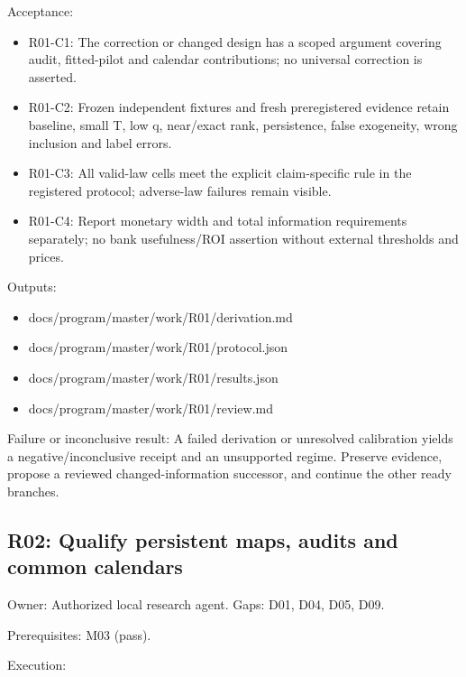 \documentclass[
  11pt,
  a4paper,
]{article}
\providecommand{\tightlist}{%
  \setlength{\itemsep}{0pt}\setlength{\parskip}{0pt}}
\begin{document}
Acceptance:

\begin{itemize}
\tightlist
\item
  R01-C1: The correction or changed design has a scoped argument
  covering audit, fitted-pilot and calendar contributions; no universal
  correction is asserted.
\item
  R01-C2: Frozen independent fixtures and fresh preregistered evidence
  retain baseline, small T, low q, near/exact rank, persistence, false
  exogeneity, wrong inclusion and label errors.
\item
  R01-C3: All valid-law cells meet the explicit claim-specific rule in
  the registered protocol; adverse-law failures remain visible.
\item
  R01-C4: Report monetary width and total information requirements
  separately; no bank usefulness/ROI assertion without external
  thresholds and prices.
\end{itemize}

Outputs:

\begin{itemize}
\tightlist
\item
  docs/program/master/work/R01/derivation.md
\item
  docs/program/master/work/R01/protocol.json
\item
  docs/program/master/work/R01/results.json
\item
  docs/program/master/work/R01/review.md
\end{itemize}

Failure or inconclusive result: A failed derivation or unresolved
calibration yields a negative/inconclusive receipt and an unsupported
regime. Preserve evidence, propose a reviewed changed-information
successor, and continue the other ready branches.

\hypertarget{r02-qualify-persistent-maps-audits-and-common-calendars}{%
\subsection{R02: Qualify persistent maps, audits and common
calendars}\label{r02-qualify-persistent-maps-audits-and-common-calendars}}

Owner: Authorized local research agent. Gaps: D01, D04, D05, D09.

Prerequisites: M03 (pass).

Execution:
\end{document}
